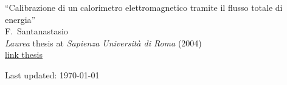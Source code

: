 \documentclass[10pt, a4paper]{article}
\begin{document}
\begin{thebibliography}{599}
``Calibrazione di un calorimetro elettromagnetico tramite il flusso totale di energia''
  \\{}F.~Santanastasio
  \\{}\textit{Laurea} thesis at \textit{Sapienza Universit\`a di Roma} (2004)
  \\{}\href{https://www.roma1.infn.it/exp/cms/tesi/tesi_laurea_completate/santanastasio.pdf}{link thesis}


\end{thebibliography}

\vfill{}
\hrulefill

\begin{center}
{\footnotesize Last updated: \today}
\end{center}
\end{document}
